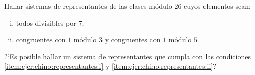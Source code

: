 
\begin{ejerCongruencias}\label{ejer:congruencias:chino:representantes}
	Hallar sistemas de representantes de las clases m\'odulo $26$
	cuyos elementos sean:
	\begin{enumerate}[(i)]
		\item\label{item:ejer:chino:representantes:i}
			todos divisibles por $7$;
		\item\label{item:ejer:chino:representantes:ii}
			congruentes con $1$ m\'odulo $3$ y congruentes con $1$
			m\'odulo $5$
	\end{enumerate}
	?`Es posible hallar un sistema de representantes que cumpla con las
	condiciones \eqref{item:ejer:chino:representantes:i} y
	\eqref{item:ejer:chino:representantes:ii}?
\end{ejerCongruencias}

